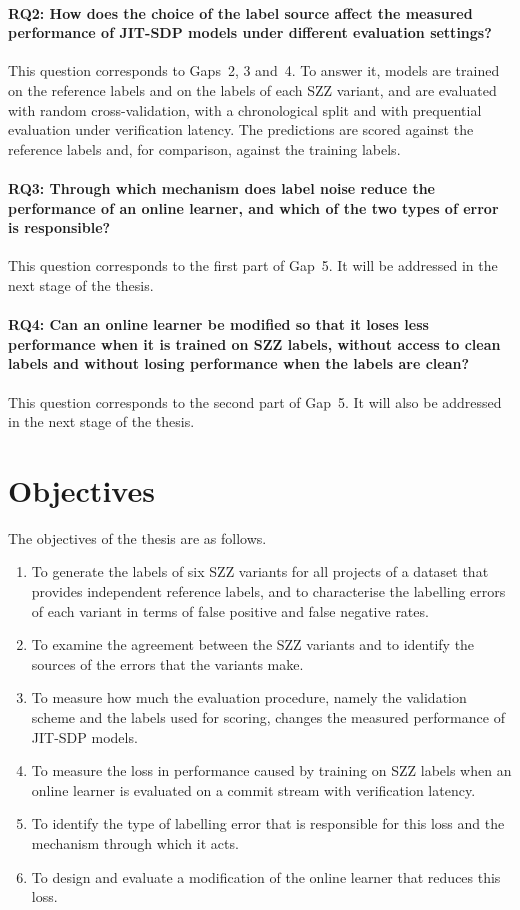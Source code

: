 \documentclass[12pt,a4paper,oneside]{report}
\begin{document}
\paragraph{RQ2: How does the choice of the label source affect the measured
performance of JIT-SDP models under different evaluation settings?}
This question corresponds to Gaps~2, 3 and~4. To answer it, models are
trained on the reference labels and on the labels of each SZZ variant, and
are evaluated with random cross-validation, with a chronological split and
with prequential evaluation under verification latency. The predictions are
scored against the reference labels and, for comparison, against the training
labels.

\paragraph{RQ3: Through which mechanism does label noise reduce the performance of
an online learner, and which of the two types of error is responsible?}
This question corresponds to the first part of Gap~5. It will be addressed in
the next stage of the thesis.

\paragraph{RQ4: Can an online learner be modified so that it loses less
performance when it is trained on SZZ labels, without access to clean labels
and without losing performance when the labels are clean?}
This question corresponds to the second part of Gap~5. It will also be
addressed in the next stage of the thesis.

\section{Objectives}

The objectives of the thesis are as follows.

\begin{enumerate}[leftmargin=*]
\item To generate the labels of six SZZ variants for all projects of a
dataset that provides independent reference labels, and to characterise the
labelling errors of each variant in terms of false positive and false
negative rates.
\item To examine the agreement between the SZZ variants and to identify the
sources of the errors that the variants make.
\item To measure how much the evaluation procedure, namely the validation
scheme and the labels used for scoring, changes the measured performance of
JIT-SDP models.
\item To measure the loss in performance caused by training on SZZ labels
when an online learner is evaluated on a commit stream with verification
latency.
\item To identify the type of labelling error that is responsible for this
loss and the mechanism through which it acts.
\item To design and evaluate a modification of the online learner that
reduces this loss.
\end{enumerate}
\end{document}
